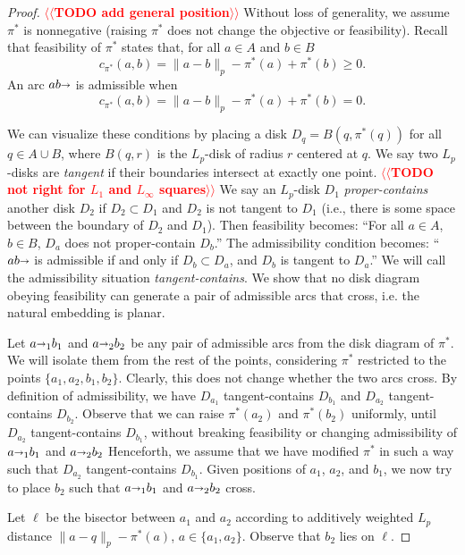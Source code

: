 \documentclass[11pt]{article}
\makeatletter
\def\norm#1{\mathopen\| #1 \mathclose\|}	%
\def\arcto{\mathord\shortrightarrow}
\def\arc#1#2{#1\arcto#2}
\theoremstyle{plain}
\numberwithin{figure}{section}
\def\n@te#1{\textsf{\boldmath \textbf{$\langle\!\langle$#1$\rangle\!\rangle$}}\leavevmode}
\def\note#1{\textcolor{red}{\n@te{#1}}}
\makeatother
\begin{document}
\begin{proof}
\note{TODO add general position} %
Without loss of generality, we assume $\pi^*$ is nonnegative (raising $\pi^*$
does not change the objective or feasibility).
Recall that feasibility of $\pi^*$ states that, for all $a \in A$ and $b \in B$
\[
	c_{\pi^*}(a, b) = \norm{a-b}_p - \pi^*(a) + \pi^*(b) \geq 0.
\]
An arc $\arc{ab}$ is admissible when
\[
	c_{\pi^*}(a, b) = \norm{a-b}_p - \pi^*(a) + \pi^*(b) = 0.
\]

We can visualize these conditions by placing a disk $D_q = B(q, \pi^*(q))$ for
all $q \in A \cup B$, where $B(q, r)$ is the $L_p$-disk of radius $r$ centered
at $q$.
We say two $L_p$-disks are \emph{tangent} if their boundaries intersect at
exactly one point.
\note{TODO not right for $L_1$ and $L_\infty$ squares} %
We say an $L_p$-disk $D_1$ \emph{proper-contains} another disk $D_2$ if
$D_2 \subset D_1$ and $D_2$ is not tangent to $D_1$
(i.e., there is some space between the boundary of $D_2$ and $D_1$).
Then feasibility becomes: ``For all $a \in A$, $b \in B$, $D_a$ does not
proper-contain $D_b$.''
The admissibility condition becomes: ``$\arc{ab}$ is admissible if and only if
$D_b \subset D_a$, and $D_b$ is tangent to $D_a$.''
We will call the admissibility situation \emph{tangent-contains}.
We show that no disk diagram obeying feasibility can generate a pair of
admissible arcs that cross, i.e. the natural embedding is planar.

Let $\arc a_1 b_1$ and $\arc a_2 b_2$ be any pair of admissible arcs from the
disk diagram of $\pi^*$.
We will isolate them from the rest of the points, considering $\pi^*$
restricted to the points $\{a_1, a_2, b_1, b_2\}$.
Clearly, this does not change whether the two arcs cross.
By definition of admissibility, we have $D_{a_1}$ tangent-contains $D_{b_1}$
and $D_{a_2}$ tangent-contains $D_{b_2}$.
Observe that we can raise $\pi^*(a_2)$ and $\pi^*(b_2)$ uniformly, until
$D_{a_2}$ tangent-contains $D_{b_1}$, without breaking feasibility or changing
admissibility of $\arc a_1 b_1$ and $\arc a_2 b_2$
Henceforth, we assume that we have modified $\pi^*$ in such a way such that
$D_{a_2}$ tangent-contains $D_{b_1}$.
Given positions of $a_1$, $a_2$, and $b_1$, we now try to place $b_2$ such that
$\arc a_1 b_1$ and $\arc a_2 b_2$ cross.

Let $\ell$ be the bisector between $a_1$ and $a_2$ according to additively
weighted $L_p$ distance $\norm{a - q}_p - \pi^*(a)$, $a \in \{a_1, a_2\}$.
Observe that $b_2$ lies on $\ell$.



\end{proof}
\end{document}
